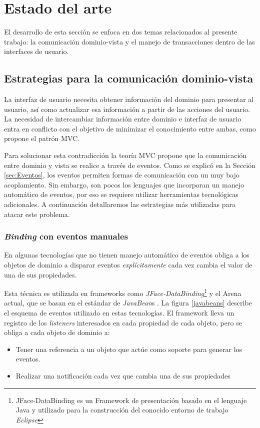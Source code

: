 \section{Estado del arte}
\label{sec:StateOfTheArt}
El desarrollo de esta sección se enfoca en dos temas relacionados al
presente trabajo: la comunicación dominio-vista y el manejo de transacciones
dentro de las interfaces de usuario.

\subsection{Estrategias para la comunicación dominio-vista}
La interfaz de usuario necesita obtener información del dominio para presentar
al usuario, así como actualizar esa información a partir de las acciones del usuario.
La necesidad de intercambiar información entre dominio e interfaz de usuario
entra en conflicto con el objetivo de minimizar el conocimiento entre ambas,
como propone el patrón MVC.

Para solucionar esta contradicción la teoría MVC propone que la
comunicación entre dominio y vista se realice a través de eventos. 
Como se explicó en la Sección \ref{sec:Eventos}, los eventos
permiten formas de comunicación con un muy bajo acoplamiento. 
Sin embargo, son pocos los lenguajes que incorporan un manejo automático de
eventos, por eso se requiere utilizar herramientas tecnológicas adicionales.
A continuación detallaremos las estrategias más utilizadas para atacar este problema.

\subsubsection{\emph{Binding} con eventos manuales}
	En algunas tecnologías que no tienen manejo automático de eventos obliga a
	los objetos de dominio a disparar eventos \emph{explícitamente} cada vez cambia
	el valor de una de sus propiedades.
	
	Esta técnica es utilizada en
	frameworks como \emph{JFace-DataBinding}\footnote{JFace-DataBinding es un
	Framework de presentación basado en el lenguaje Java y utilizado para la
	construcción del conocido entorno de trabajo \emph{Eclipse}} y el Arena
	actual, que se basan en el estándar de
	\emph{JavaBean}s \cite{sousa00formal}.
	La figura \ref{javabeans} describe el esquema de eventos utilizado en estas
	tecnologías. El framework lleva un registro de los \emph{listeners}
	interesados en cada propiedad de cada objeto, pero se obliga a cada objeto de dominio a:
	\begin{itemize}
	  \item Tener una referencia a un objeto que actúe como soporte para generar
	  los eventos.
	  \item Realizar una notificación cada vez que cambia una de sus propiedades
	\end{itemize} 

